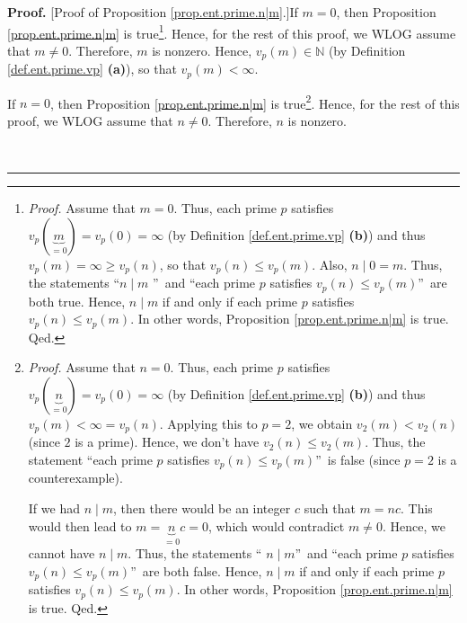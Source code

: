 \documentclass[numbers=enddot,12pt,final,onecolumn,notitlepage]{scrartcl}%
\numberwithin{exer}{subsection}
\theoremstyle{definition}
\newenvironment{proof}[1][Proof]{\noindent\textbf{#1.} }{\ \rule{0.5em}{0.5em}}
\begin{document}
\begin{proof}
[Proof of Proposition \ref{prop.ent.prime.n|m}.]If $m=0$, then Proposition
\ref{prop.ent.prime.n|m} is true\footnote{\textit{Proof.} Assume that $m=0$.
Thus, each prime $p$ satisfies $v_{p}\left(  \underbrace{m}_{=0}\right)
=v_{p}\left(  0\right)  =\infty$ (by Definition \ref{def.ent.prime.vp}
\textbf{(b)}) and thus $v_{p}\left(  m\right)  =\infty\geq v_{p}\left(
n\right)  $, so that $v_{p}\left(  n\right)  \leq v_{p}\left(  m\right)  $.
Also, $n\mid0=m$. Thus, the statements \textquotedblleft$n\mid m$%
\textquotedblright\ and \textquotedblleft each prime $p$ satisfies
$v_{p}\left(  n\right)  \leq v_{p}\left(  m\right)  $\textquotedblright\ are
both true. Hence, $n\mid m$ if and only if each prime $p$ satisfies
$v_{p}\left(  n\right)  \leq v_{p}\left(  m\right)  $. In other words,
Proposition \ref{prop.ent.prime.n|m} is true. Qed.}. Hence, for the rest of
this proof, we WLOG assume that $m\neq0$. Therefore, $m$ is nonzero. Hence,
$v_{p}\left(  m\right)  \in\mathbb{N}$ (by Definition \ref{def.ent.prime.vp}
\textbf{(a)}), so that $v_{p}\left(  m\right)  <\infty$.

If $n=0$, then Proposition \ref{prop.ent.prime.n|m} is
true\footnote{\textit{Proof.} Assume that $n=0$. Thus, each prime $p$
satisfies $v_{p}\left(  \underbrace{n}_{=0}\right)  =v_{p}\left(  0\right)
=\infty$ (by Definition \ref{def.ent.prime.vp} \textbf{(b)}) and thus
$v_{p}\left(  m\right)  <\infty=v_{p}\left(  n\right)  $. Applying this to
$p=2$, we obtain $v_{2}\left(  m\right)  <v_{2}\left(  n\right)  $ (since $2$
is a prime). Hence, we don't have $v_{2}\left(  n\right)  \leq v_{2}\left(
m\right)  $. Thus, the statement \textquotedblleft each prime $p$ satisfies
$v_{p}\left(  n\right)  \leq v_{p}\left(  m\right)  $\textquotedblright\ is
false (since $p=2$ is a counterexample).
\par
If we had $n\mid m$, then there would be an integer $c$ such that $m=nc$. This
would then lead to $m=\underbrace{n}_{=0}c=0$, which would contradict $m\neq
0$. Hence, we cannot have $n\mid m$. Thus, the statements \textquotedblleft%
$n\mid m$\textquotedblright\ and \textquotedblleft each prime $p$ satisfies
$v_{p}\left(  n\right)  \leq v_{p}\left(  m\right)  $\textquotedblright\ are
both false. Hence, $n\mid m$ if and only if each prime $p$ satisfies
$v_{p}\left(  n\right)  \leq v_{p}\left(  m\right)  $. In other words,
Proposition \ref{prop.ent.prime.n|m} is true. Qed.}. Hence, for the rest of
this proof, we WLOG assume that $n\neq0$. Therefore, $n$ is nonzero.


\end{proof}
\end{document}
